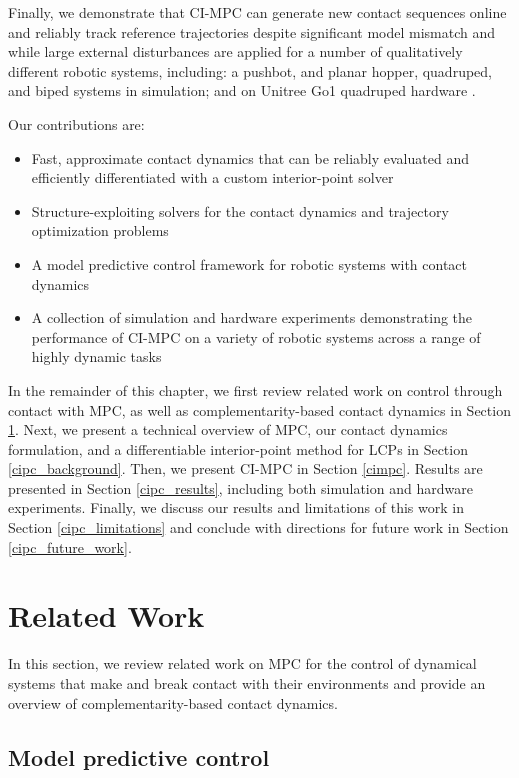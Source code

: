 Finally, we demonstrate that CI-MPC can generate new contact sequences online and reliably track reference trajectories despite significant model mismatch and while large external disturbances are applied for a number of qualitatively different robotic systems, including: a pushbot, and planar hopper, quadruped, and biped systems in simulation; and on Unitree Go1 quadruped hardware \cite{unitree_go1}.

Our contributions are:
\begin{itemize}
	\item Fast, approximate contact dynamics that can be reliably evaluated and efficiently differentiated with a custom interior-point solver
	\item Structure-exploiting solvers for the contact dynamics and trajectory optimization problems
	\item A model predictive control framework for robotic systems with contact dynamics
	\item A collection of simulation and hardware experiments demonstrating the performance of CI-MPC on a variety of robotic systems across a range of highly dynamic tasks
\end{itemize}

In the remainder of this chapter, we first review related work on control through contact with MPC, as well as complementarity-based contact dynamics in Section \ref{cipc_related_work}. Next, we present a technical overview of MPC, our contact dynamics formulation, and a differentiable interior-point method for LCPs in Section \ref{cipc_background}. Then, we present CI-MPC in Section \ref{cimpc}. Results are presented in Section \ref{cipc_results}, including both simulation and hardware experiments. Finally, we discuss our results and limitations of this work in Section \ref{cipc_limitations} and conclude with directions for future work in Section \ref{cipc_future_work}.

\section{Related Work} \label{cipc_related_work}
In this section, we review related work on MPC for the control of dynamical systems that make and break contact with their environments and provide an overview of complementarity-based contact dynamics.

\subsection{Model predictive control}

